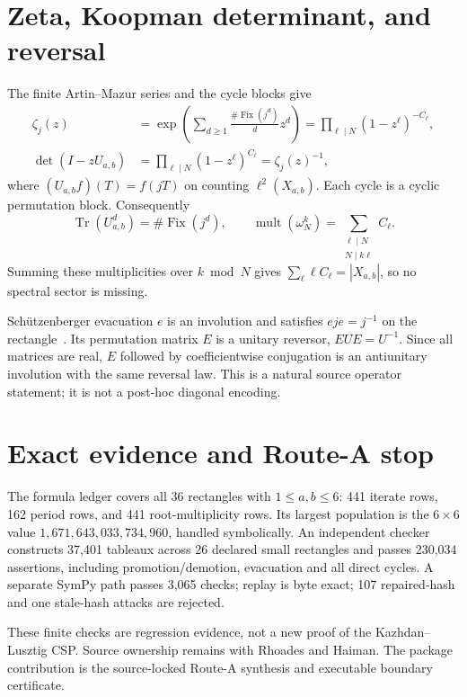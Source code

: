 \documentclass[9pt]{extarticle}
\begin{document}
\section{Zeta, Koopman determinant, and reversal}
The finite Artin--Mazur series and the cycle blocks give
\begin{align}
 \zeta_j(z)
 &=\exp\!\left(\sum_{d\ge1}
 \frac{\#\operatorname{Fix}(j^d)}d z^d\right)
 =\prod_{\ell\mid N}(1-z^\ell)^{-C_\ell},\label{eq:zeta}\\
 \det(I-zU_{a,b})
 &=\prod_{\ell\mid N}(1-z^\ell)^{C_\ell}
 =\zeta_j(z)^{-1},\label{eq:det}
\end{align}
where $(U_{a,b}f)(T)=f(jT)$ on counting $\ell^2(X_{a,b})$.  Each cycle is a
cyclic permutation block.  Consequently
\[
 \operatorname{Tr}(U_{a,b}^d)=\#\operatorname{Fix}(j^d),\qquad
 \operatorname{mult}(\omega_N^k)
 =\sum_{\substack{\ell\mid N\\N\mid k\ell}}C_\ell.
\]
Summing these multiplicities over $k\bmod N$ gives
$\sum_\ell\ell C_\ell=|X_{a,b}|$, so no spectral sector is missing.

Sch\"utzenberger evacuation $e$ is an involution and satisfies
$eje=j^{-1}$ on the rectangle~\cite{Rhoades10}.  Its permutation matrix $E$
is a unitary reversor, $EUE=U^{-1}$.  Since all matrices are real, $E$ followed
by coefficientwise conjugation is an antiunitary involution with the same
reversal law.  This is a natural source operator statement; it is not a
post-hoc diagonal encoding.

\section{Exact evidence and Route-A stop}
The formula ledger covers all 36 rectangles with $1\le a,b\le6$: 441
iterate rows, 162 period rows, and 441 root-multiplicity rows.  Its largest
population is the $6\times6$ value
$1{,}671{,}643{,}033{,}734{,}960$, handled symbolically.  An independent
checker constructs 37{,}401 tableaux across 26 declared small rectangles and
passes 230{,}034 assertions, including promotion/demotion, evacuation and all
direct cycles.  A separate SymPy path passes 3{,}065 checks; replay is byte
exact; 107 repaired-hash and one stale-hash attacks are rejected.

These finite checks are regression evidence, not a new proof of the
Kazhdan--Lusztig CSP.  Source ownership remains with Rhoades and Haiman.  The
package contribution is the source-locked Route-A synthesis and executable
boundary certificate.
\end{document}
